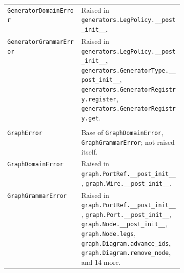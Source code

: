 {\begin{xltabular}{\linewidth}{@{}>{\raggedright\arraybackslash}p{0.42\linewidth}X@{}}
\texttt{GeneratorDomainError}\newline{} & Raised in \texttt{generators.\allowbreak{}LegPolicy.\allowbreak{}\_\allowbreak{}\_\allowbreak{}post\_\allowbreak{}init\_\allowbreak{}\_\allowbreak{}}. \\
\texttt{GeneratorGrammarError}\newline{} & Raised in \texttt{generators.\allowbreak{}LegPolicy.\allowbreak{}\_\allowbreak{}\_\allowbreak{}post\_\allowbreak{}init\_\allowbreak{}\_\allowbreak{}}, \texttt{generators.\allowbreak{}GeneratorType.\allowbreak{}\_\allowbreak{}\_\allowbreak{}post\_\allowbreak{}init\_\allowbreak{}\_\allowbreak{}}, \texttt{generators.\allowbreak{}GeneratorRegistry.\allowbreak{}register}, \texttt{generators.\allowbreak{}GeneratorRegistry.\allowbreak{}get}. \\
\midrule
{}\\*
\texttt{GraphError}\newline{} & Base of \texttt{GraphDomainError}, \texttt{GraphGrammarError}; not raised itself. \\
\texttt{GraphDomainError}\newline{} & Raised in \texttt{graph.\allowbreak{}PortRef.\allowbreak{}\_\allowbreak{}\_\allowbreak{}post\_\allowbreak{}init\_\allowbreak{}\_\allowbreak{}}, \texttt{graph.\allowbreak{}Wire.\allowbreak{}\_\allowbreak{}\_\allowbreak{}post\_\allowbreak{}init\_\allowbreak{}\_\allowbreak{}}. \\
\texttt{GraphGrammarError}\newline{} & Raised in \texttt{graph.\allowbreak{}PortRef.\allowbreak{}\_\allowbreak{}\_\allowbreak{}post\_\allowbreak{}init\_\allowbreak{}\_\allowbreak{}}, \texttt{graph.\allowbreak{}Port.\allowbreak{}\_\allowbreak{}\_\allowbreak{}post\_\allowbreak{}init\_\allowbreak{}\_\allowbreak{}}, \texttt{graph.\allowbreak{}Node.\allowbreak{}\_\allowbreak{}\_\allowbreak{}post\_\allowbreak{}init\_\allowbreak{}\_\allowbreak{}}, \texttt{graph.\allowbreak{}Node.\allowbreak{}legs}, \texttt{graph.\allowbreak{}Diagram.\allowbreak{}advance\_\allowbreak{}ids}, \texttt{graph.\allowbreak{}Diagram.\allowbreak{}remove\_\allowbreak{}node}, and 14 more. \\

\end{xltabular}}
